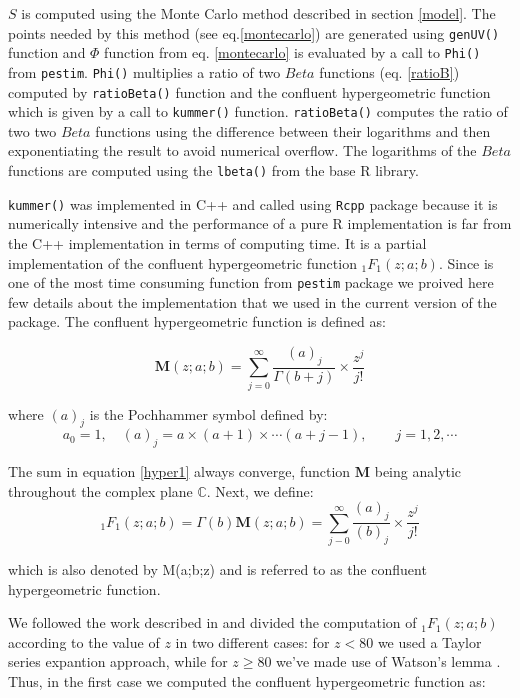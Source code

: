 \documentclass[12pt, a4paper]{article}
\begin{document}
$S$ is computed using the Monte Carlo method described in section \ref{model}. The points needed by this 
method (see eq.\ref{montecarlo}) are generated using \texttt{genUV()} function and $\Phi$ function 
from eq. \ref{montecarlo} is evaluated by a call to \texttt{Phi()} 
from \texttt{pestim}. \texttt{Phi()} multiplies a ratio of two $Beta$ functions (eq. \ref{ratioB}) computed 
by \texttt{ratioBeta()} function and the confluent hypergeometric function which is given by a call to \texttt{kummer()} function. 
\texttt{ratioBeta()} computes the ratio of two two $Beta$ functions using the difference between 
their logarithms and then exponentiating the result to avoid numerical overflow. The logarithms of 
the $Beta$ functions are computed using the \texttt{lbeta()} from the base R library.

\texttt{kummer()}  was implemented in C++ and called using \texttt{Rcpp} package because it is numerically 
intensive and the performance of a pure R implementation is far from the C++ implementation in terms of 
computing time.  It is a partial implementation of the confluent hypergeometric function ${}_{1}F_{1}(z ; a; b)$. Since 
is one of the most time consuming function from \texttt{pestim} package we proived here few details about the 
implementation that we used in the current version of the package.
The confluent hypergeometric function is defined as:

\begin{equation}\label{hyper1}
\mathbf{M}(z; a; b)= \sum_{j=0}^{\infty} \frac{(a)_{j}}{\Gamma(b+j)} \times \frac{z^{j}}{j!}
\end{equation}

\noindent where $(a)_{j}$ is the Pochhammer symbol defined by:
\begin{equation}
a_{0} = 1, \quad  (a)_{j} = a \times (a+1) \times \cdots (a+j-1), \qquad j=1,2,\cdots
\end{equation}

The sum in equation \ref{hyper1} always converge, function $\mathbf{M}$ being analytic 
throughout the complex plane $\mathbb{C}$. Next, we define:
\begin{equation}
{}_{1}F_{1}(z; a; b) = \Gamma(b) \mathbf{M}(z; a; b) = \sum_{j-0}^{\infty}\frac{(a)_{j}}{(b)_{j}} \times \frac{z^{j}}{j!}
\end{equation}

\noindent which is also denoted by M(a;b;z) and is referred to as the confluent hypergeometric function.

We followed the work described in \cite{hyper} and divided the computation of ${}_{1}F_{1}(z ; a; b)$ according to 
the value of $z$ in two different cases: for $z < 80$ we used a Taylor series expantion approach, 
while for $z \ge 80$ we've made use of Watson’s lemma \cite{watson}.
Thus, in the first case we computed the confluent hypergeometric function as:
\end{document}
